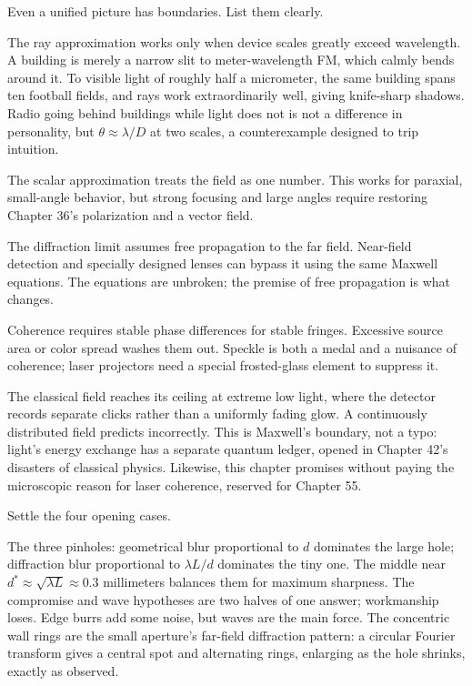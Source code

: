 
Even a unified picture has boundaries. List them clearly.

The ray approximation works only when device scales greatly exceed wavelength. A building is merely a narrow slit to meter-wavelength FM, which calmly bends around it. To visible light of roughly half a micrometer, the same building spans ten football fields, and rays work extraordinarily well, giving knife-sharp shadows. Radio going behind buildings while light does not is not a difference in personality, but \(\theta\approx\lambda/D\) at two scales, a counterexample designed to trip intuition.

The scalar approximation treats the field as one number. This works for paraxial, small-angle behavior, but strong focusing and large angles require restoring Chapter 36's polarization and a vector field.

The diffraction limit assumes free propagation to the far field. Near-field detection and specially designed lenses can bypass it using the same Maxwell equations. The equations are unbroken; the premise of free propagation is what changes.

Coherence requires stable phase differences for stable fringes. Excessive source area or color spread washes them out. Speckle is both a medal and a nuisance of coherence; laser projectors need a special frosted-glass element to suppress it.

The classical field reaches its ceiling at extreme low light, where the detector records separate clicks rather than a uniformly fading glow. A continuously distributed field predicts incorrectly. This is Maxwell's boundary, not a typo: light's energy exchange has a separate quantum ledger, opened in Chapter 42's disasters of classical physics. Likewise, this chapter promises without paying the microscopic reason for laser coherence, reserved for Chapter 55.


Settle the four opening cases.

The three pinholes: geometrical blur proportional to \(d\) dominates the large hole; diffraction blur proportional to \(\lambda L/d\) dominates the tiny one. The middle near \(d^{*}\approx\sqrt{\lambda L}\approx 0.3\) millimeters balances them for maximum sharpness. The compromise and wave hypotheses are two halves of one answer; workmanship loses. Edge burrs add some noise, but waves are the main force. The concentric wall rings are the small aperture's far-field diffraction pattern: a circular Fourier transform gives a central spot and alternating rings, enlarging as the hole shrinks, exactly as observed.

